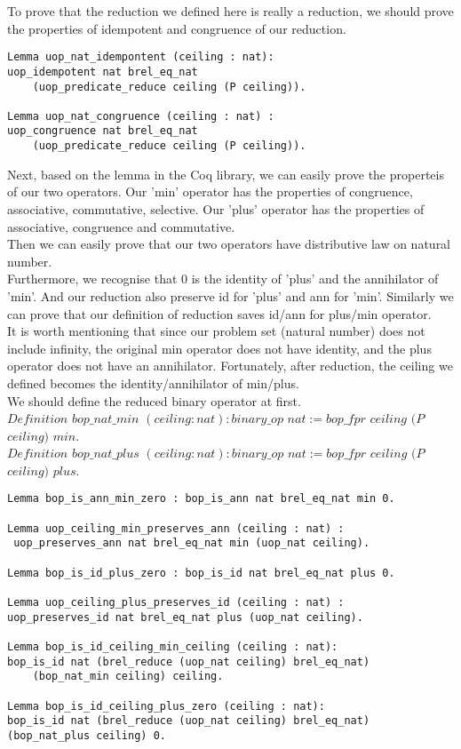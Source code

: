 \documentclass[a4paper,12pt,twoside,openright]{report}
\begin{document}
To prove that the reduction we defined here is really a reduction, we should prove the properties of idempotent and congruence of our reduction.
\begin{lstlisting}
Lemma uop_nat_idempontent (ceiling : nat): 
uop_idempotent nat brel_eq_nat 
	(uop_predicate_reduce ceiling (P ceiling)).
	
Lemma uop_nat_congruence (ceiling : nat) : 
uop_congruence nat brel_eq_nat 
	(uop_predicate_reduce ceiling (P ceiling)).
\end{lstlisting}
Next, based on the lemma in the Coq library, we can easily prove the properteis of our two operators. Our 'min' operator has the properties of congruence, associative, commutative, selective. Our 'plus' operator has the properties of associative, congruence and commutative.\\
Then we can easily prove that our two operators have distributive law on natural number.\\
Furthermore, we recognise that 0 is the identity of 'plus' and the annihilator of 'min'. And our reduction also preserve id for 'plus' and ann for 'min'.
Similarly we can prove that our definition of reduction saves id/ann for plus/min operator.\\
It is worth mentioning that since our problem set (natural number) does not include infinity, the original min operator does not have identity, and the plus operator does not have an annihilator.
Fortunately, after reduction, the ceiling we defined becomes the identity/annihilator of min/plus.\\
We should define the reduced binary operator at first.\\
$Definition$ $bop\_nat\_min$ $(ceiling : nat) : binary\_op$ $nat := bop\_fpr$ $ceiling $ $(P$ $ ceiling)$ $ min.$\\
$Definition$ $bop\_nat\_plus$ $(ceiling : nat) : binary\_op$ $nat := bop\_fpr$ $ceiling $ $(P$ $ ceiling)$ $ plus.$
\begin{lstlisting}
Lemma bop_is_ann_min_zero : bop_is_ann nat brel_eq_nat min 0.

Lemma uop_ceiling_min_preserves_ann (ceiling : nat) :
 uop_preserves_ann nat brel_eq_nat min (uop_nat ceiling).

Lemma bop_is_id_plus_zero : bop_is_id nat brel_eq_nat plus 0.

Lemma uop_ceiling_plus_preserves_id (ceiling : nat) :
uop_preserves_id nat brel_eq_nat plus (uop_nat ceiling).

Lemma bop_is_id_ceiling_min_ceiling (ceiling : nat): 
bop_is_id nat (brel_reduce (uop_nat ceiling) brel_eq_nat) 
	(bop_nat_min ceiling) ceiling.

Lemma bop_is_id_ceiling_plus_zero (ceiling : nat): 
bop_is_id nat (brel_reduce (uop_nat ceiling) brel_eq_nat) 
(bop_nat_plus ceiling) 0.
\end{lstlisting}
\end{document}
